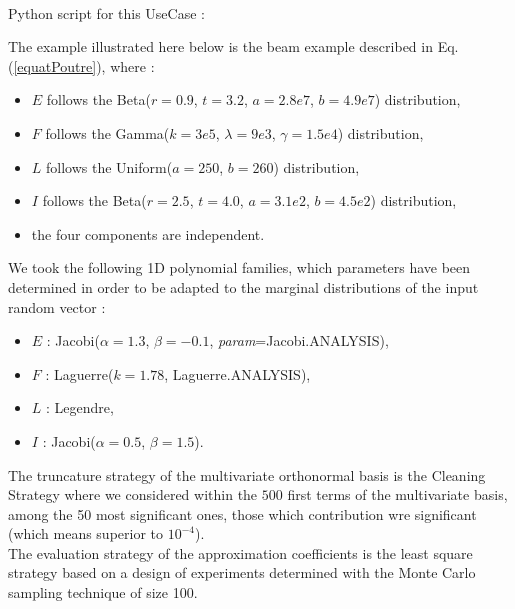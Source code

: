              \textspace\\
             Python  script for this UseCase :




             \vspace*{0.1cm}

             The example illustrated here below is the beam example described in Eq. (\ref{equatPoutre}), where :
             \begin{itemize}
             \item $E$ follows the Beta($r = 0.9$, $t = 3.2$, $a = 2.8e7$, $b = 4.9e7$) distribution,
             \item $F$ follows the Gamma($k = 3e5$, $\lambda = 9e3$, $\gamma = 1.5e4$)  distribution,
             \item $L$ follows the Uniform($a = 250$, $b=260$) distribution,
             \item $I$ follows the Beta($r = 2.5$, $t = 4.0$, $a = 3.1e2$, $b = 4.5e2$) distribution,
             \item the four components are independent.
             \end{itemize}

             We took the following 1D polynomial families, which parameters have been determined in order to be adapted to the marginal distributions of the input random vector :
             \begin{itemize}
             \item $E$ : Jacobi($\alpha = 1.3$, $\beta = -0.1$, \textit{param}=Jacobi.ANALYSIS),
             \item $F$ : Laguerre($k = 1.78$, Laguerre.ANALYSIS),
             \item $L$ : Legendre,
             \item $I$ : Jacobi($\alpha = 0.5$, $\beta = 1.5$).
             \end{itemize}

             The truncature strategy of the multivariate orthonormal basis is the Cleaning Strategy where we considered within the $500$ first terms of the multivariate basis, among the 50 most significant ones, those which contribution wre significant (which means superior to $10^{-4}$).\\

             The evaluation strategy of the approximation coefficients is the least square strategy based on a design of experiments  determined with the Monte Carlo sampling technique of size 100.\\

